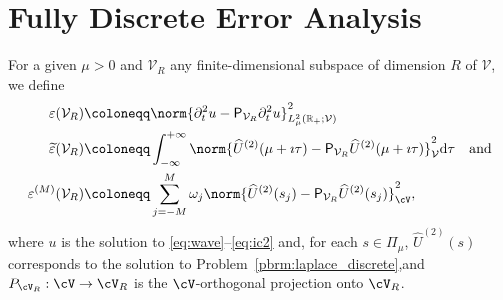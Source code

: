 \section{Fully Discrete Error Analysis}\label{sec:fully_discrete}
For a given $\mu>0$ and $\mathcal{V}_R$ any finite-dimensional subspace of dimension $R$
of $\mathcal{V}$, we define
\begin{subequations}
\begin{align}
	\varepsilon(\mathcal{V}_R)
	&
	\coloneqq
	\norm{
		\partial^2_t u
		-
		\mathsf{P}_{\mathcal{V}_R}
		\partial^2_t u
	}^2_{L^2_\mu(\mathbb{R}_+;\mathcal{V})} 
     \label{eq:error_1}
    \\
	\widetilde{\varepsilon}(\mathcal{V}_R)
	&
	\coloneqq
		\int_{-\infty}^{+\infty}
	\norm{
		\widehat{U}^{(2)}(\mu+\imath \tau) 
		-
		\mathsf{P}_{\mathcal{V}_R}
		\widehat{U}^{(2)}(\mu+\imath \tau)
	}^2_{\mathcal{V}}
	\text{d}\tau
     \label{eq:error_2}
	\quad
	\text{and}
	\\
	\varepsilon^{(M)}(\mathcal{V}_R)
	&
	\coloneqq
    	\sum_{j=-M}^{M} 
	\omega_j
	\norm{
		\widehat{U}^{(2)}(s_j) 
		- 
		\mathsf{P}_{\mathcal{V}_R}
		\widehat{U}^{(2)}(s_j) 
	}^2_{\cV}
    \label{eq:error_3},
\end{align}
\end{subequations}
where $u$ is the solution to \eqref{eq:wave}--\eqref{eq:ic2} 
and, for each $s \in \Pi_\mu$, $\widehat{U}^{(2)}(s)$ corresponds to the solution to
Problem~\ref{pbrm:laplace_discrete},and $P_{\cV_R}:\cV\to\cV_R$ is the $\cV$-orthogonal projection onto $\cV_R$.

